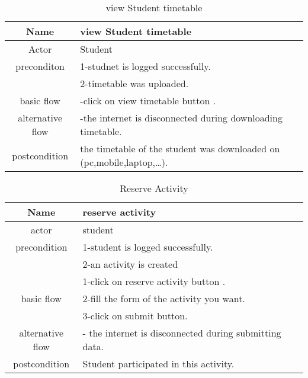 \documentclass{article}
\begin{document}
    \begin{table}[!h]
    	\centering
    	\caption{view Student timetable}
    	\label{view student timetable}
    	\begin{tabular}{|c|l|}
    		\hline
    		Name & view Student timetable\\
    		\hline
    		Actor& Student \\
    		\hline
    		preconditon & 1-studnet is logged successfully.\\
    		            & 2-timetable was uploaded.\\
          \hline
    	   basic flow & -click on view timetable button .\\
    	   \hline
    	   
    	   alternative flow & -the internet is disconnected during downloading timetable.\\
    	   \hline
    	   
    	   postcondition & the timetable of the student was downloaded on (pc,mobile,laptop,\ldots).\\
    	   \hline
    	        
     	\end{tabular}
    \end{table}
    
    \begin{table}[!h]
    	\centering
    	\label{Recerv Activity}
    	\caption{Reserve Activity}
    	\begin{tabular}{|c|l|}
    		\hline
    		Name & reserve activity\\
    		\hline
    		actor & student \\
    		\hline 
    		precondition & 1-student is logged successfully.\\
    		             & 2-an activity is created\\
           \hline
           	
    		           & 1-click on reserve activity button .\\
    		basic flow & 2-fill the form of the activity you want.\\
    		           & 3-click on submit button.\\
    		\hline
    		alternative flow & - the internet is disconnected during submitting data.\\
    		\hline
    		postcondition & Student participated in this activity.\\
    		\hline
    	\end{tabular}
    \end{table}
    
\end{document}
